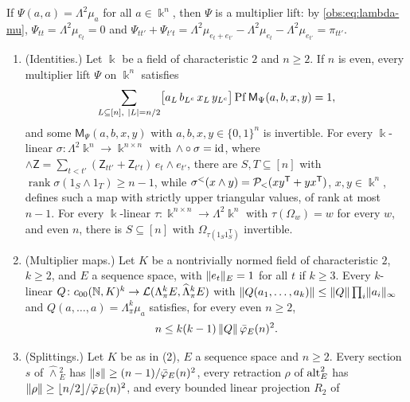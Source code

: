 If $\Psi(a,a)=\Lambda^2\mu_a$ for all $a\in\Bbbk^n$, then $\Psi$ is a multiplier lift: by \eqref{obs:eq:lambda-mu},
$\Psi_{tt}=\Lambda^2\mu_{e_t}=0$ and
$\Psi_{tt'}+\Psi_{t't}=\Lambda^2\mu_{e_t+e_{t'}}-\Lambda^2\mu_{e_t}-\Lambda^2\mu_{e_{t'}}=\pi_{tt'}$.

\begin{theorem}\label{obs:thm:char-two}
\leavevmode
\begin{enumerate}
\item \textup{(Identities.)} Let $\Bbbk$ be a field of characteristic $2$ and $n\ge2$. If $n$ is even, every multiplier lift
$\Psi$ on $\Bbbk^n$ satisfies
\begin{equation}\label{obs:eq:pfaffian-identity}
\sum_{L\subseteq[n],\ \lvert L\rvert=n/2}\bigl[a_L\,b_{L^c}\,x_L\,y_{L^c}\bigr]\operatorname{Pf}\mathsf M_\Psi(a,b,x,y)=1,
\end{equation}
and some $\mathsf M_\Psi(a,b,x,y)$ with $a,b,x,y\in\{0,1\}^n$ is invertible. For every $\Bbbk$-linear
$\sigma\colon\Lambda^2\Bbbk^n\to\Bbbk^{n\times n}$ with $\wedge\circ\sigma=\mathrm{id}$, where
$\wedge\mathsf Z=\sum_{t<t'}(\mathsf Z_{tt'}+\mathsf Z_{t't})\,e_t\wedge e_{t'}$, there are $S,T\subseteq[n]$ with
$\operatorname{rank}\sigma(1_S\wedge1_T)\ge n-1$, while $\sigma^<(x\wedge y)=\mathcal P_<(xy^{\mathsf T}+yx^{\mathsf T})$,
$x,y\in\Bbbk^n$, defines such a map with strictly upper triangular values, of rank at most $n-1$. For every
$\Bbbk$-linear $\tau\colon\Bbbk^{n\times n}\to\Lambda^2\Bbbk^n$ with $\tau(\Omega_w)=w$ for every $w$, and even $n$,
there is $S\subseteq[n]$ with $\Omega_{\tau(1_S1_S^{\mathsf T})}$ invertible.
\item \textup{(Multiplier maps.)} Let $K$ be a nontrivially normed field of characteristic $2$, $k\ge2$, and $E$ a
sequence space, with $\lVert e_t\rVert_E=1$ for all $t$ if $k\ge3$. Every $k$-linear
$Q\colon c_{00}(\mathbb N,K)^k\to\mathcal L(\Lambda^k_\pi E,\widehat\Lambda^k_\pi E)$ with
$\lVert Q(a_1,\dots,a_k)\rVert\le\lVert Q\rVert\prod_i\lVert a_i\rVert_\infty$ and $Q(a,\dots,a)=\Lambda^k_\pi\mu_a$ satisfies, for every
even $n\ge2$,
\begin{equation}\label{obs:eq:multiplier-bound}
n\le k(k-1)\,\lVert Q\rVert\,\bar\varphi_E(n)^2 .
\end{equation}
\item \textup{(Splittings.)} Let $K$ be as in \textup{(2)}, $E$ a sequence space and $n\ge2$. Every section $s$ of
$\widehat\wedge{}^2_E$ has $\lVert s\rVert\ge(n-1)/\bar\varphi_E(n)^2$, every retraction $\rho$ of $\operatorname{alt}^2_E$ has
$\lVert \rho\rVert\ge\lfloor n/2\rfloor/\bar\varphi_E(n)^2$, and every bounded linear projection $R_2$ of

\end{enumerate}
\end{theorem}
